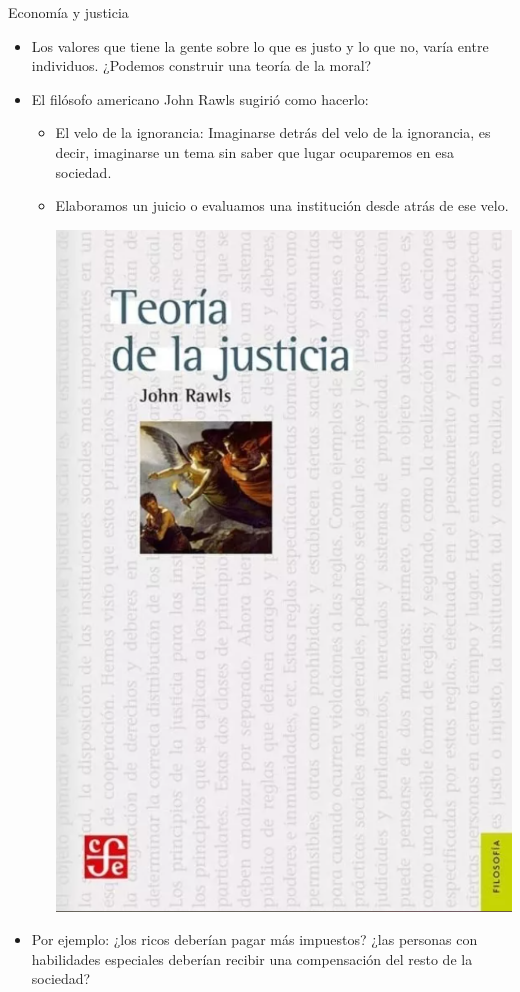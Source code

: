 \documentclass{beamer}
\begin{document}
\begin{frame}{Economía y justicia}
    \begin{itemize}
        \item Los valores que tiene la gente sobre lo que es justo y lo que no, varía entre individuos. ¿Podemos construir una teoría de la moral?
        \item El filósofo americano John Rawls sugirió como hacerlo:
        \begin{itemize}
            \item El velo de la ignorancia: Imaginarse detrás del velo de la ignorancia, es decir, imaginarse un tema sin saber que lugar ocuparemos en esa sociedad.
            \item Elaboramos un juicio o evaluamos una institución desde atrás de ese velo.
            \begin{center}
                \includegraphics[scale=0.15]{../Figures/Rawls (1971).png}
            \end{center}
        \end{itemize}
        \item Por ejemplo: ¿los ricos deberían pagar más impuestos? ¿las personas con habilidades especiales deberían recibir una compensación del resto de la sociedad? 
    \end{itemize}
\end{frame}
\end{document}
